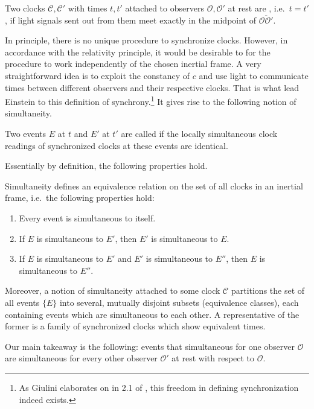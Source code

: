 \begin{defi}\label{defi:einstein_synchrony}
	Two clocks $\mathcal{C}, \mathcal{C}'$ with times $t, t'$ attached to observers $\mathcal{O}, \mathcal{O}'$ at rest are , i.e.~$t = t'$, if light signals sent out from them meet exactly in the midpoint of $\overline{\mathcal{O} \mathcal{O}'}$.
\end{defi}
In principle, there is no unique procedure to synchronize clocks. However, in accordance with the relativity principle, it would be desirable to for the procedure to work independently of the chosen inertial frame. A very straightforward idea is to exploit the constancy of $c$ and use light to communicate times between different observers and their respective clocks. That is what lead Einstein to this definition of synchrony.\footnote{As Giulini elaborates on in 2.1 of \cite{giulini_srt}, this freedom in defining synchronization indeed exists.} It gives rise to the following notion of simultaneity.
\begin{defi}[Simultaneity]\label{defi:simultaneity}
	Two events $E$ at $t$ and $E'$ at $t'$ are called  if the locally simultaneous clock readings of synchronized clocks at these events are identical.%
\end{defi}

Essentially by definition, the following properties hold.
\begin{prop}
	Simultaneity defines an equivalence relation on the set of all clocks in an inertial frame, i.e.~the following properties hold:
	\begin{enumerate}
		\item Every event is simultaneous to itself.
		
		\item If $E$ is simultaneous to $E'$, then $E'$ is simultaneous to $E$.
		
		\item If $E$ is simultaneous to $E'$ and $E'$ is simultaneous to $E''$, then $E$ is simultaneous to $E''$.
	\end{enumerate}
	
	Moreover, a notion of simultaneity attached to some clock $\mathcal{C}$ partitions the set of all events $\{E\}$ into several, mutually disjoint subsets (equivalence classes), each containing events which are simultaneous to each other. A representative of the former is a family of synchronized clocks which show equivalent times.
\end{prop}
Our main takeaway is the following: events that simultaneous for one observer $\mathcal{O}$ are simultaneous for every other observer $\mathcal{O}'$ at rest with respect to $\mathcal{O}$.


